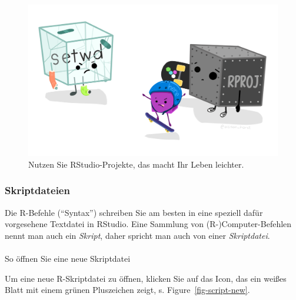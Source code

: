 \documentclass[
  letterpaper,
  DIV=11,
  numbers=noendperiod]{scrartcl}
\makeatletter
\let\oldparagraph\paragraph
\renewcommand{\paragraph}{
    \@ifstar
      \xxxParagraphStar
      \xxxParagraphNoStar
  }
\newcommand{\xxxParagraphStar}[1]{\oldparagraph*{#1}\mbox{}}
\newcommand{\xxxParagraphNoStar}[1]{\oldparagraph{#1}\mbox{}}
\theoremstyle{definition}
\theoremstyle{definition}
\theoremstyle{definition}
\theoremstyle{remark}
\makeatother
\begin{document}
\begin{figure}
\begin{minipage}{0.50\linewidth}
{\includegraphics{img/cracked_setwd.png}

}


\end{minipage}%

\caption{\label{fig-projects}Nutzen Sie RStudio-Projekte, das macht Ihr
Leben leichter.}

\end{figure}%

\subsubsection{Skriptdateien}\label{skriptdateien}

Die R-Befehle (``Syntax'') schreiben Sie am besten in eine speziell
dafür vorgesehene Textdatei in RStudio. Eine Sammlung von
(R-)Computer-Befehlen nennt man auch ein \emph{Skript}, daher spricht
man auch von einer \emph{Skriptdatei}.

\paragraph{So öffnen Sie eine neue
Skriptdatei}\label{so-uxf6ffnen-sie-eine-neue-skriptdatei}

Um eine neue R-Skriptdatei zu öffnen, klicken Sie auf das Icon, das ein
weißes Blatt mit einem grünen Pluszeichen zeigt, s.
Figure~\ref{fig-script-new}.
\end{document}
